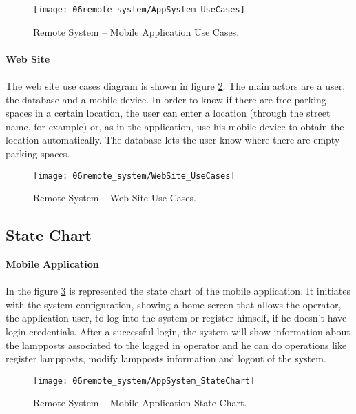 \begin{figure}[H]
        \centering
        \texttt{[image: 06remote\_system/AppSystem\_UseCases]}
        \caption{Remote System – Mobile Application Use Cases.}
        \label{fig:UseCases_application}
\end{figure}

\paragraph{}
\textbf{Web Site}
\paragraph{}
The web site use cases diagram is shown in figure \ref{fig:UseCases_WebSite}. The main actors are a user, the database and a mobile device. In order to know if there are free parking spaces in a certain location, the user can enter a location (through the street name, for example) or, as in the application, use his mobile device to obtain the location automatically. The database lets the user know where there are empty parking spaces.

\begin{figure}[H]
        \centering
        \texttt{[image: 06remote\_system/WebSite\_UseCases]}
        \caption{Remote System – Web Site Use Cases.}
        \label{fig:UseCases_WebSite}
\end{figure}

\subsection{State Chart}
\textbf{Mobile Application}
\paragraph{}
In the figure \ref{fig:StateChart_application} is represented the state chart of the mobile application. It initiates with the system configuration, showing a home screen that allows the operator, the application user, to log into the system or register himself, if he doesn’t have login credentials. After a successful login, the system will show information about the lampposts associated to the logged in operator and he can do operations like register lampposts, modify lampposts information and logout of the system.

\begin{figure}[H]
        \centering
        \texttt{[image: 06remote\_system/AppSystem\_StateChart]}
        \caption{Remote System – Mobile Application State Chart.}
        \label{fig:StateChart_application}
\end{figure}

